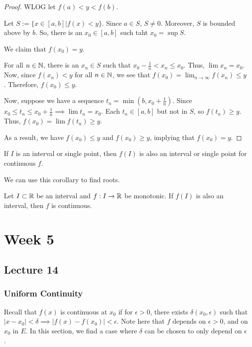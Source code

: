 \documentclass{book}
\begin{document}
\begin{proof}
    WLOG let $f(a) < y < f(b)$. 

    Let $S := \{x \in [a, b] | f(x) < y\}$. Since $a \in S$, $S \neq 0$. Moreover, $S$ is bounded above by $b$. So, there is an $x_0 \in [a, b]$ such taht $x_0 = \sup S$.

    We claim that $f(x_0) = y$.

    For all $n \in \mathbb{N}$, there is an $x_n \in S$ such that $x_0 - \frac{1}{n} < x_n \leq x_0$. Thus, $\lim x_n = x_0$. Now, since $f(x_n) < y$ for all $n \in \mathbb{N}$, we see that $f(x_0) = \lim_{n \to \infty} f(x_n) \leq y$. Therefore, $f(x_0) \leq y$. 

    Now, suppose we have a sequence $t_n = \min(b, x_0 + \frac{1}{n})$. Since $x_0 \leq t_n \leq x_0 + \frac{1}{n} \implies \lim t_n = x_0$. Each $t_n \in [a, b]$ but not in $S$, so $f(t_n) \geq y$. Thus, $f(x_0) = \lim f(t_n) \geq y$.

    As a result, we have $f(x_0) \leq y$ and $f(x_0) \geq y$, implying that $f(x_0) = y$.
\end{proof}

\begin{corollary}
    If $I$ is an interval or single point, then $f(I)$ is also an interval or single point for continuous $f$.
\end{corollary}

We can use this corollary to find roots.

\begin{thm}
    Let $I \subset \mathbb{R}$ be an interval and $f: I \to \mathbb{R}$ be monotonic. If $f(I)$ is also an interval, then $f$ is continuous.
\end{thm}
\chapter{Week 5}
\section{Lecture 14}
\subsection{Uniform Continuity}
Recall that $f(x)$ is continuous at $x_0$ if for $\epsilon > 0$, there exists $\delta (x_0, \epsilon)$ such that $|x - x_0| < \delta \implies |f(x) - f(x_0)| < \epsilon$. Note here that $f$ depends on $\epsilon > 0$, and on $x_0$ in $E$. In this section, we find a case where $\delta$ can be chosen to only depend on $\epsilon$.
\end{document}
